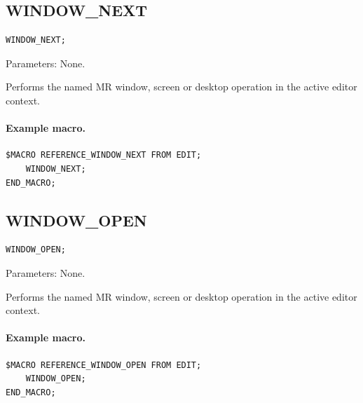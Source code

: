 \documentclass[a4paper,10pt,twoside,openany]{book}
\newenvironment{mrmacextension}{\begin{changebar}}{\end{changebar}}
\begin{document}
\begin{mrmacextension}
\label{prim:procedure-window-next}
\subsection*{WINDOW\_NEXT}
\begin{verbatim}
WINDOW_NEXT;
\end{verbatim}
Parameters: None.

Performs the named MR window, screen or desktop operation in the active editor context.

\paragraph{Example macro.}
\begin{verbatim}
$MACRO REFERENCE_WINDOW_NEXT FROM EDIT;
    WINDOW_NEXT;
END_MACRO;
\end{verbatim}
\end{mrmacextension}

\begin{mrmacextension}
\label{prim:procedure-window-open}
\subsection*{WINDOW\_OPEN}
\begin{verbatim}
WINDOW_OPEN;
\end{verbatim}
Parameters: None.

Performs the named MR window, screen or desktop operation in the active editor context.

\paragraph{Example macro.}
\begin{verbatim}
$MACRO REFERENCE_WINDOW_OPEN FROM EDIT;
    WINDOW_OPEN;
END_MACRO;
\end{verbatim}
\end{mrmacextension}
\end{document}
